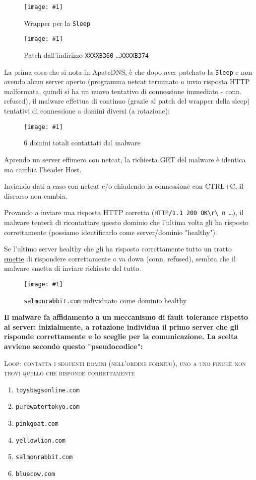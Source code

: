 \documentclass[
    a4paper, %
    11pt %
]{article}
\newcommand{\pic}[4]{\begin{figure}[H]
            \centering
            \texttt{[image: \#1]}
            \caption{#2}
            \label{fig:#1}
            \end{figure}}
\begin{document}
            \pic{sleep}{Wrapper per la \texttt{Sleep}}{15cm}{5cm}
            \pic{sleep_patched}{Patch dall'indirizzo \texttt{XXXXB360} \dots \texttt{XXXXB374}}{10cm}{9cm}

            La prima cosa che si nota in ApateDNS, è che dopo aver patchato la \texttt{Sleep} e non avendo alcun
            server aperto (programma netcat terminato o invio risposta HTTP malformata, quindi si ha un nuovo tentativo di connessione immediato - conn. refused), il malware effettua di continuo (grazie al patch del wrapper della sleep) tentativi di connessione a domini diversi (a rotazione):

            \pic{moredomains}{6 domini totali contattati dal malware}{6cm}{7cm}

            Aprendo un server effimero con netcat, la richiesta GET del malware è identica ma cambia l'header Host.

            Inviando dati a caso con netcat e/o chiudendo la connessione con CTRL+C, il discorso non cambia.

            Provando a inviare una risposta HTTP corretta (\texttt{HTTP/1.1 200 OK\textbackslash r\textbackslash 
            n \dots}), il malware tenterà di ricontattare questo dominio che l'ultima volta gli ha risposto 
            correttamente (possiamo identificarlo come server/dominio "healthy").

            Se l'ultimo server healthy che gli ha risposto correttamente tutto un tratto \underline{smette} di rispondere
            correttamente o va down (conn. refused), sembra che il malware smetta di inviare richieste del tutto.
            
            \pic{domainok}{\texttt{salmonrabbit.com} individuato come dominio healthy}{5cm}{4cm}

            \textbf{Il malware fa affidamento a un meccanismo di fault tolerance rispetto ai server: 
            inizialmente, a rotazione individua il primo server che gli risponde correttamente e lo sceglie per
            la comunicazione. La scelta avviene secondo questo "pseudocodice":}

            \textsc{Loop: contatta i seguenti domini (nell'ordine fornito), uno a uno finchè non trovi quello che risponde correttamente}
            
            \begin{enumerate}
                \item \texttt{toysbagsonline.com}
                \item \texttt{purewatertokyo.com}
                \item \texttt{pinkgoat.com}
                \item \texttt{yellowlion.com}
                \item \texttt{salmonrabbit.com}
                \item \texttt{bluecow.com}
            \end{enumerate}
            
\end{document}
